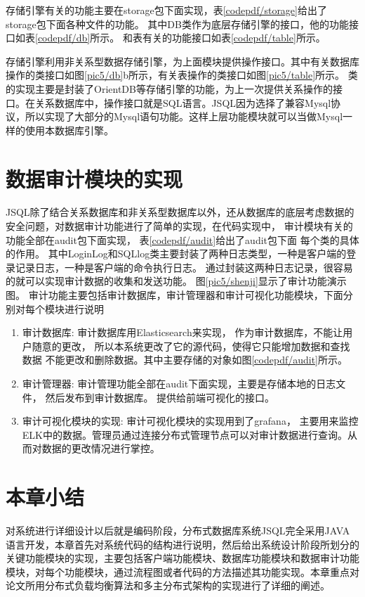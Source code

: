 存储引擎有关的功能主要在storage包下面实现，表\ref{codepdf/storage}给出了
storage包下面各种文件的功能。
其中DB类作为底层存储引擎的接口，他的功能接口如表\ref{codepdf/db}所示。
和表有关的功能接口如表\ref{codepdf/table}所示。

存储引擎利用非关系型数据存储引擎，为上面模块提供操作接口。其中有关数据库操作的类接口如图\ref{pic5/db}b所示，有关表操作的类接口如图\ref{pic5/table}所示。
类的实现主要是封装了OrientDB等存储引擎的功能，为上一次提供关系操作的接口。在关系数据库中，操作接口就是SQL语言。JSQL因为选择了兼容Mysql协议，所以实现了大部分的Mysql语句功能。这样上层功能模块就可以当做Mysql一样的使用本数据库引擎。
\section{数据审计模块的实现}
JSQL除了结合关系数据库和非关系型数据库以外，还从数据库的底层考虑数据的安全问题，对数据审计功能进行了简单的实现，在代码实现中，
审计模块有关的功能全部在audit包下面实现，
表\ref{codepdf/audit}给出了audit包下面
每个类的具体的作用。
其中LoginLog和SQLlog类主要封装了两种日志类型，一种是客户端的登录记录日志，一种是客户端的命令执行日志。
通过封装这两种日志记录，很容易的就可以实现审计数据的收集和发送功能。
图\ref{pic5/shenji}显示了审计功能演示图。
审计功能主要包括审计数据库，审计管理器和审计可视化功能模块，下面分别对每个模块进行说明
\begin{enumerate}[fullwidth,itemindent=2em,listparindent=2em]
	\item 审计数据库:
	审计数据库用Elasticsearch来实现，
	作为审计数据库，不能让用户随意的更改，
	所以本系统更改了它的源代码，使得它只能增加数据和查找数据
	不能更改和删除数据。其中主要存储的对象如图\ref{codepdf/audit}所示。
	\item 审计管理器:
	审计管理功能全部在audit下面实现，主要是存储本地的日志文件，
	然后发布到审计数据库。
	提供给前端可视化的接口。
	\item 审计可视化模块的实现:
	审计可视化模块的实现用到了grafana，
	主要用来监控ELK中的数据。管理员通过连接分布式管理节点可以对审计数据进行查询。从而对数据的更改情况进行掌控。
\end{enumerate}
\section{本章小结}
对系统进行详细设计以后就是编码阶段，分布式数据库系统JSQL完全采用JAVA语言开发，本章首先对系统代码的结构进行说明，然后给出系统设计阶段所划分的关键功能模块的实现，主要包括客户端功能模块、数据库功能模块和数据审计功能模块，对每个功能模块，通过流程图或者代码的方法描述其功能实现。本章重点对论文所用分布式负载均衡算法和多主分布式架构的实现进行了详细的阐述。